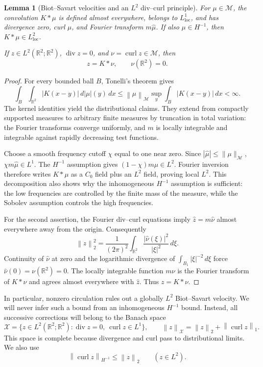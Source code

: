 \documentclass[11pt,a4paper,reqno]{amsart}
\theoremstyle{plain}
\newtheorem{lemma}[theorem]{Lemma}
\theoremstyle{definition}
\theoremstyle{remark}
\numberwithin{equation}{section}
\newcommand{\R}{\mathbb R}
\newcommand{\M}{\mathcal M}
\newcommand{\X}{\mathcal X}
\newcommand{\curl}{\operatorname{curl}}
\newcommand{\Div}{\operatorname{div}}
\newcommand{\norm}[2]{\left\|#1\right\|_{#2}}
\newcommand{\dd}{\,dx}
\begin{document}
\begin{lemma}[Biot--Savart velocities and an $L^2$ div--curl principle]
\label{lem:canonical}
For $\mu\in\M$, the convolution $K*\mu$ is defined almost
everywhere, belongs to $L^1_{\mathrm{loc}}$, and has divergence zero,
curl $\mu$, and Fourier transform $m\widehat\mu$. If also
$\mu\in H^{-1}$, then $K*\mu\in L^2_{\mathrm{loc}}$.

If $z\in L^2(\R^2;\R^2)$, $\Div z=0$, and
$\nu=\curl z\in\M$, then
\begin{equation}\label{eq:divcurl}
 z=K*\nu,\qquad \nu(\R^2)=0.
\end{equation}
\end{lemma}
\begin{proof}
For every bounded ball $B$, Tonelli's theorem gives
\[
 \int_B\!\int_{\R^2}|K(x-y)|\,d|\mu|(y)\,dx
 \le\norm\mu\M\sup_y\int_B|K(x-y)|\dd<\infty.
\]
The kernel identities yield the distributional claims. They extend from
compactly supported measures to arbitrary finite measures by truncation
in total variation: the Fourier transforms converge uniformly, and $m$
is locally integrable and integrable against rapidly decreasing test
functions.

Choose a smooth frequency cutoff $\chi$ equal to one near zero. Since
$|\widehat\mu|\le\|\mu\|_{\M}$,
$\chi m\widehat\mu\in L^1$. The $H^{-1}$ assumption gives
$(1-\chi)m\widehat\mu\in L^2$. Fourier inversion therefore writes
$K*\mu$ as a $C_0$ field plus an $L^2$ field, proving local $L^2$.
This decomposition also shows why the inhomogeneous $H^{-1}$
assumption is sufficient: the low frequencies are controlled by the
finite mass of the measure, while the Sobolev assumption controls the
high frequencies.

For the second assertion, the Fourier div--curl equations imply
$\widehat z=m\widehat\nu$ almost everywhere away from the origin.
Consequently
\[
 \norm z2^2=\frac1{(2\pi)^2}
   \int_{\R^2}\frac{|\widehat\nu(\xi)|^2}{|\xi|^2}\,d\xi.
\]
Continuity of $\widehat\nu$ at zero and the logarithmic divergence of
$\int_{B_1}|\xi|^{-2}\,d\xi$ force
$\widehat\nu(0)=\nu(\R^2)=0$. The locally integrable function
$m\widehat\nu$ is the Fourier transform of $K*\nu$ and agrees almost
everywhere with $\widehat z$. Thus $z=K*\nu$.
\end{proof}

In particular, nonzero circulation rules out a globally $L^2$
Biot--Savart velocity. We will never infer such a bound from an
inhomogeneous $H^{-1}$ bound. Instead, all successive corrections
will belong to the Banach space
\begin{equation}\label{eq:graph-space}
 \X=\{z\in L^2(\R^2;\R^2):\Div z=0,\ \curl z\in L^1\},
 \qquad \norm z\X=\norm z2+\norm{\curl z}1.
\end{equation}
This space is complete because divergence and curl pass to
distributional limits.
We also use
\begin{equation}\label{eq:curl-Hminus}
 \norm{\curl z}{H^{-1}}\le\norm z2\qquad(z\in L^2).
\end{equation}
\end{document}
